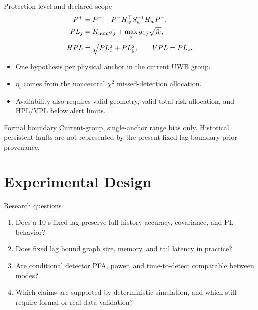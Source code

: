 \documentclass[aspectratio=169,10pt]{beamer}
\begin{document}
\begin{frame}{Protection level and declared scope}
\small
\begin{align*}
P^+ &= P^- -P^-H_w^\top S_w^{-1}H_wP^-,\\
PL_j &= K_{\rm nom}\sigma_j+\max_i g_{i,j}\sqrt{\bar\eta_i},\\
HPL&=\sqrt{PL_x^2+PL_y^2},\qquad VPL=PL_z.
\end{align*}
\begin{itemize}
\item One hypothesis per physical anchor in the current UWB group.
\item $\bar\eta_i$ comes from the noncentral $\chi^2$ missed-detection allocation.
\item Availability also requires valid geometry, valid total risk allocation, and HPL/VPL below alert limits.
\end{itemize}
\begin{alertblock}{Formal boundary}
Current-group, single-anchor range bias only. Historical persistent faults are not represented by the present fixed-lag boundary prior provenance.
\end{alertblock}
\end{frame}

\section{Experimental Design}
\begin{frame}{Research questions}
\begin{enumerate}
\item Does a 10 s fixed lag preserve full-history accuracy, covariance, and PL behavior?
\item Does fixed lag bound graph size, memory, and tail latency in practice?
\item Are conditional detector PFA, power, and time-to-detect comparable between modes?
\item Which claims are supported by deterministic simulation, and which still require formal or real-data validation?
\end{enumerate}
\end{frame}
\end{document}
